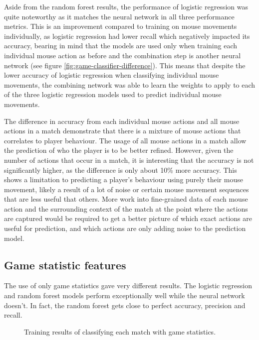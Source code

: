 \documentclass[Report.tex]{subfiles}
\newcommand{\newaxis}[7]{
\begin{axis}[
    ybar,
    title={\textbf{#1}},
    ymin=#3, ymax=#4,
    bar width=1em,
    width={#5},
    height={#6},
    legend style={at={#7},anchor=north,legend columns=-1},
    enlarge x limits=0.4,
    x tick label style={align=center,text width=2cm},
    symbolic x coords={Logistic Regression, Random Forest, Multi-layer Perceptron},
    xtick=data,
    ylabel={#2}
]
}
\newcommand{\plotbar}[3] {
\addplot+[
	discard if not={features}{#1},
] table [x=model, y=#2, col sep=comma] {data/15-game-cv.csv};
\addlegendentry{#3}
}
\begin{document}
Aside from the random forest results, the performance of logistic regression was quite noteworthy as it matches the neural network in all three performance metrics. This is an improvement compared to training on mouse movements individually, as logistic regression had lower recall which negatively impacted its accuracy, bearing in mind that the models are used only when training each individual mouse action as before and the combination step is another neural network (see figure \ref{fig:game-classifier-difference}). This means that despite the lower accuracy of logistic regression when classifying individual mouse movements, the combining network was able to learn the weights to apply to each of the three logistic regression models used to predict individual mouse movements. 

The difference in accuracy from each individual mouse actions and all mouse actions in a match demonstrate that there is a mixture of mouse actions that correlates to player behaviour. The usage of all mouse actions in a match allow the prediction of who the player is to be better refined. However, given the number of actions that occur in a match, it is interesting that the accuracy is not significantly higher, as the difference is only about 10\% more accuracy. This shows a limitation to predicting a player's behaviour using purely their mouse movement, likely a result of a lot of noise or certain mouse movement sequences that are less useful that others. More work into fine-grained data of each mouse action and the surrounding context of the match at the point where the actions are captured would be required to get a better picture of which exact actions are useful for prediction, and which actions are only adding noise to the prediction model. 




\subsection{Game statistic features}
The use of only game statistics gave very different results. The logistic regression and random forest models perform exceptionally well while the neural network doesn't. In fact, the random forest gets close to perfect accuracy, precision and recall. 

\begin{figure}[H]
\centering
{}
\caption{Training results of classifying each match with game statistics.}
\end{figure}
\end{document}
